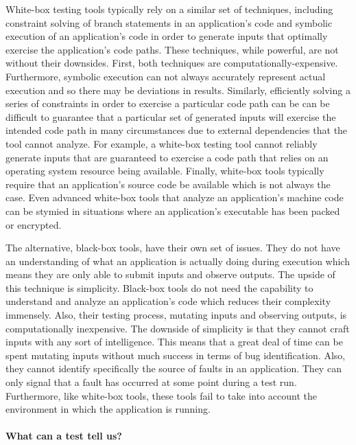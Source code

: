     White-box testing tools typically rely on a similar set of techniques, including constraint solving of branch
    statements in an application's code and symbolic execution of an application's code in order to generate inputs
    that optimally exercise the application's code paths. These techniques, while powerful, are not without their
    downsides. First, both techniques are computationally-expensive. Furthermore, symbolic execution can not always
    accurately represent actual execution and so there may be deviations in results. Similarly, efficiently solving
    a series of constraints in order to exercise a particular code path can be can be difficult to guarantee that a
    particular set of generated inputs will exercise the intended code path in many circumstances due to external
    dependencies that the tool cannot analyze. For example, a white-box testing tool cannot reliably generate inputs
    that are guaranteed to exercise a code path that relies on an operating system resource being available.
    Finally, white-box tools typically require that an application's source code be available which is not always
    the case. Even advanced white-box tools that analyze an application's machine code can be stymied in situations
    where an application's executable has been packed or encrypted.

    The alternative, black-box tools, have their own set of issues. They do not have an understanding of what an
    application is actually doing during execution which means they are only able to submit inputs and observe
    outputs.  The upside of this technique is simplicity. Black-box tools do not need the capability to understand
    and analyze an application's code which reduces their complexity immensely. Also, their testing process,
    mutating inputs and observing outputs, is computationally inexpensive. The downside of simplicity is that they
    cannot craft inputs with any sort of intelligence. This means that a great deal of time can be spent mutating
    inputs without much success in terms of bug identification. Also, they cannot identify specifically the source
    of faults in an application. They can only signal that a fault has occurred at some point during a test run.
    Furthermore, like white-box tools, these tools fail to take into account the environment in which the
    application is running.

    \paragraph{What can a test tell us?}

